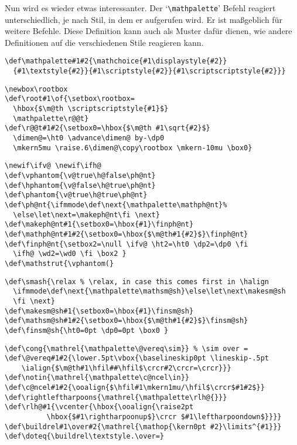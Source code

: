 \begin{appendix}
\begin{verbatim}
\end{verbatim}
Nun wird es wieder etwas interessanter. Der `\verb|\mathpalette|'
Befehl reagiert unterschiedlich, je nach Stil, in dem er aufgerufen
wird. Er ist ma\ss{}geblich f\"ur weitere Befehle. Diese Definition kann
auch als Muster daf\"ur dienen, wie andere Definitionen auf die
verschiedenen Stile reagieren kann.
\begin{verbatim}
\def\mathpalette#1#2{\mathchoice{#1\displaystyle{#2}}
  {#1\textstyle{#2}}{#1\scriptstyle{#2}}{#1\scriptscriptstyle{#2}}}
\end{verbatim}
\begin{verbatim}
\newbox\rootbox
\def\root#1\of{\setbox\rootbox=
  \hbox{$\m@th \scriptscriptstyle{#1}$}
  \mathpalette\r@@t}
\def\r@@t#1#2{\setbox0=\hbox{$\m@th #1\sqrt{#2}$}
  \dimen@=\ht0 \advance\dimen@ by-\dp0
  \mkern5mu \raise.6\dimen@\copy\rootbox \mkern-10mu \box0}
\end{verbatim}
\begin{verbatim}
\newif\ifv@ \newif\ifh@
\def\vphantom{\v@true\h@false\ph@nt}
\def\hphantom{\v@false\h@true\ph@nt}
\def\phantom{\v@true\h@true\ph@nt}
\def\ph@nt{\ifmmode\def\next{\mathpalette\mathph@nt}%
  \else\let\next=\makeph@nt\fi \next}
\def\makeph@nt#1{\setbox0=\hbox{#1}\finph@nt}
\def\mathph@nt#1#2{\setbox0=\hbox{$\m@th#1{#2}$}\finph@nt}
\def\finph@nt{\setbox2=\null \ifv@ \ht2=\ht0 \dp2=\dp0 \fi
  \ifh@ \wd2=\wd0 \fi \box2 }
\def\mathstrut{\vphantom(}
\end{verbatim}
\begin{verbatim}
\def\smash{\relax % \relax, in case this comes first in \halign
  \ifmmode\def\next{\mathpalette\mathsm@sh}\else\let\next\makesm@sh
  \fi \next}
\def\makesm@sh#1{\setbox0=\hbox{#1}\finsm@sh}
\def\mathsm@sh#1#2{\setbox0=\hbox{$\m@th#1{#2}$}\finsm@sh}
\def\finsm@sh{\ht0=0pt \dp0=0pt \box0 }
\end{verbatim}
\begin{verbatim}
\def\cong{\mathrel{\mathpalette\@vereq\sim}} % \sim over =
\def\@vereq#1#2{\lower.5pt\vbox{\baselineskip0pt \lineskip-.5pt
    \ialign{$\m@th#1\hfil##\hfil$\crcr#2\crcr=\crcr}}}
\def\notin{\mathrel{\mathpalette\c@ncel\in}}
\def\c@ncel#1#2{\ooalign{$\hfil#1\mkern1mu/\hfil$\crcr$#1#2$}}
\def\rightleftharpoons{\mathrel{\mathpalette\rlh@{}}}
\def\rlh@#1{\vcenter{\hbox{\ooalign{\raise2pt
          \hbox{$#1\rightharpoonup$}\crcr $#1\leftharpoondown$}}}}
\def\buildrel#1\over#2{\mathrel{\mathop{\kern0pt #2}\limits^{#1}}}
\def\doteq{\buildrel\textstyle.\over=}
\end{verbatim}

\end{appendix}
